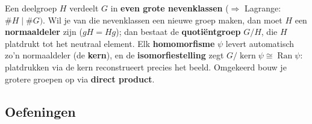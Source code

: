 \begin{roundbox}[CornflowerBlue!10][RoyalPurple]
    Een deelgroep $H$ verdeelt $G$ in \textbf{even grote nevenklassen} ($\Rightarrow$ Lagrange: $\#H \mid \#G)$. Wil je van die nevenklassen een nieuwe groep maken, dan moet $H$ een \textbf{normaaldeler} zijn ($gH=Hg$); dan bestaat de \textbf{quotiëntgroep} $G/H$, die $H$ platdrukt tot het neutraal element. Elk \textbf{homomorfisme} $\psi$ levert automatisch zo'n normaaldeler (de \textbf{kern}), en de \textbf{isomorfiestelling} zegt $G/\operatorname{kern}\psi \cong \operatorname{Ran}\psi$: platdrukken via de kern reconstrueert precies het beeld. Omgekeerd bouw je grotere groepen op via \textbf{direct product}.
\end{roundbox}
\subsection{Oefeningen}





